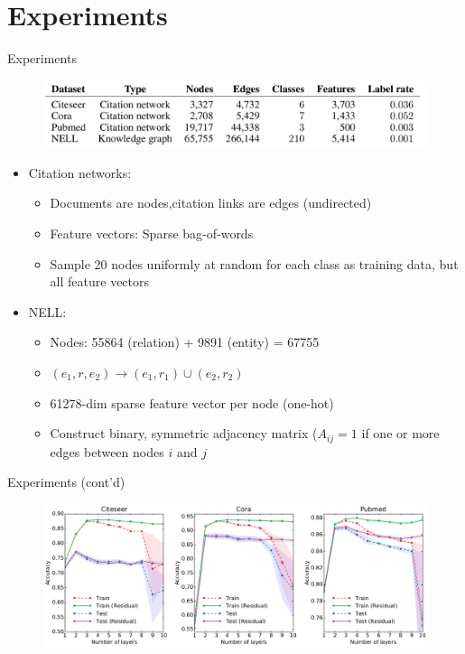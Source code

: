 \documentclass{beamer}
\begin{document}
\section{Experiments}
\begin{frame}{Experiments}
  \begin{figure}[H]
    \centering
    \includegraphics[width=1\textwidth, height=0.5\textheight, keepaspectratio]{img/dataset_stat}
    \label{fig:dataset}
  \end{figure}
  \vspace{-0.8cm}
  \begin{itemize}
  \item Citation networks:
    \begin{itemize}
    \item Documents are nodes,citation links are edges (undirected)
    \item Feature vectors: Sparse bag-of-words
    \item Sample 20 nodes uniformly at random for each class as training data, but all feature vectors
    \end{itemize}
  \item NELL:
    \begin{itemize}
    \item Nodes: 55864 (relation) + 9891 (entity) = 67755
    \item $(e_1,r,e_2) \rightarrow (e_1,r_1) \cup (e_2, r_2)$
    \item 61278-dim sparse feature vector per node (one-hot)
    \item Construct binary, symmetric adjacency matrix ($A_{ij}=1$ if one or more edges between nodes $i$ and $j$
    \end{itemize}
  \end{itemize}
\end{frame}
\begin{frame}{Experiments (cont'd)}
  \begin{figure}[H]
    \centering
    \includegraphics[width=1\textwidth, height=0.8\textheight, keepaspectratio]{img/model_depth}
    \label{fig:model_depth}
  \end{figure}
\end{frame}
\end{document}
